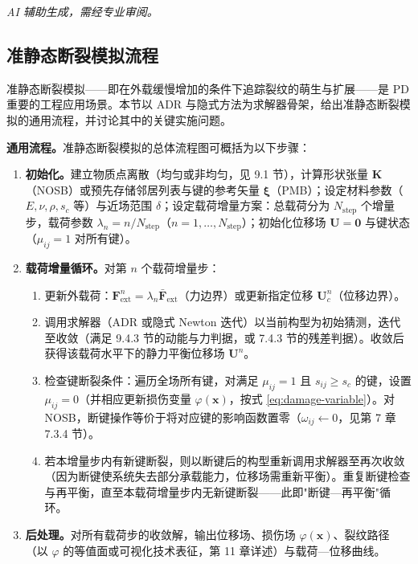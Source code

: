 \emph{AI 辅助生成，需经专业审阅。}

\subsection{准静态断裂模拟流程}\label{sec:qs-fracture}

准静态断裂模拟——即在外载缓慢增加的条件下追踪裂纹的萌生与扩展——是 PD 重要的工程应用场景。本节以 ADR 与隐式方法为求解器骨架，给出准静态断裂模拟的通用流程，并讨论其中的关键实施问题。

\textbf{通用流程。}准静态断裂模拟的总体流程图可概括为以下步骤：

\begin{enumerate}[label=(\arabic*), leftmargin=*]
  \item \textbf{初始化。}建立物质点离散（均匀或非均匀，见 9.1 节），计算形状张量 $\mathbf{K}$（NOSB）或预先存储邻居列表与键的参考矢量 $\boldsymbol{\xi}$（PMB）；设定材料参数（$E,\nu,\rho,s_c$ 等）与近场范围 $\delta$；设定载荷增量方案：总载荷分为 $N_{\text{step}}$ 个增量步，载荷参数 $\lambda_n=n/N_{\text{step}}$（$n=1,\dots,N_{\text{step}}$）；初始化位移场 $\mathbf{U}=\mathbf{0}$ 与键状态（$\mu_{ij}=1$ 对所有键）。
  \item \textbf{载荷增量循环。}对第 $n$ 个载荷增量步：
    \begin{enumerate}
      \item 更新外载荷：$\mathbf{F}_{\text{ext}}^{n}=\lambda_n\bar{\mathbf{F}}_{\text{ext}}$（力边界）或更新指定位移 $\mathbf{U}_c^{n}$（位移边界）。
      \item 调用求解器（ADR 或隐式 Newton 迭代）以当前构型为初始猜测，迭代至收敛（满足 9.4.3 节的动能与力判据，或 7.4.3 节的残差判据）。收敛后获得该载荷水平下的静力平衡位移场 $\mathbf{U}^{n}$。
      \item 检查键断裂条件：遍历全场所有键，对满足 $\mu_{ij}=1$ 且 $s_{ij}\ge s_c$ 的键，设置 $\mu_{ij}=0$（并相应更新损伤变量 $\varphi(\mathbf{x})$，按式 \eqref{eq:damage-variable}）。对 NOSB，断键操作等价于将对应键的影响函数置零（$\omega_{ij}\leftarrow0$，见第 7 章 7.3.4 节）。
      \item 若本增量步内有新键断裂，则以断键后的构型重新调用求解器至再次收敛（因为断键使系统失去部分承载能力，位移场需重新平衡）。重复断键检查与再平衡，直至本载荷增量步内无新键断裂——此即"断键—再平衡"循环。
    \end{enumerate}
  \item \textbf{后处理。}对所有载荷步的收敛解，输出位移场、损伤场 $\varphi(\mathbf{x})$、裂纹路径（以 $\varphi$ 的等值面或可视化技术表征，第 11 章详述）与载荷—位移曲线。
\end{enumerate}


